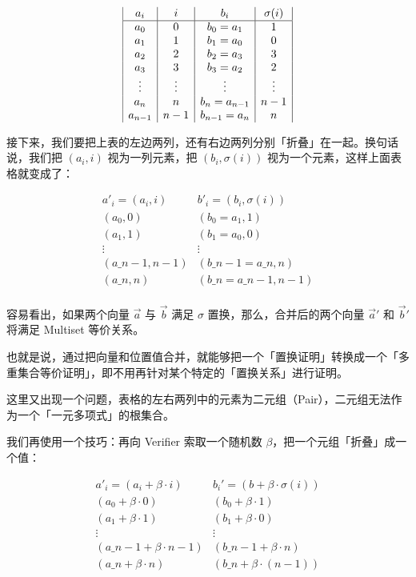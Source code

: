 \[
\begin{array}{|c|c | c|c|}
a_i & {i} & b_i & \sigma({i}) \\
\hline
a_0 & 0 & b_0=a_1 & 1 \\
a_1 & 1 & b_1=a_0 & 0 \\
a_2 & 2 & b_2=a_3 & 3 \\
a_3 & 3 & b_3=a_2 & 2 \\
\vdots & \vdots & \vdots & \vdots \\
a_n & n & b_n=a_{n-1} & n-1 \\
a_{n-1} & n-1 & b_{n-1}=a_{n} & n \\
\end{array}
\]

接下来，我们要把上表的左边两列，还有右边两列分别「折叠」在一起。换句话说，我们把
\((a_i, i)\) 视为一列元素，把 \((b_i, \sigma(i))\)
视为一个元素，这样上面表格就变成了：

\[
\begin{array}{|c|c|}
a'_i=(a_i, i) & b'_i=({b}_i, \sigma(i)) \\
\hline
(a_0, 0) & (b_0=a_1, 1) \\
(a_1, 1) & (b_1=a_0, 0) \\
\vdots & \vdots \\
(a\_{n-1}, n-1) & (b\_{n-1}=a\_{n}, n) \\
(a\_n, n) & (b\_n=a\_{n-1}, n-1) \\
\end{array}
\]

容易看出，如果两个向量 \(\vec{a}\) 与 \(\vec{b}\) 满足 \(\sigma\)
置换，那么，合并后的两个向量 \(\vec{a}'\) 和 \(\vec{b}'\) 将满足
Multiset 等价关系。

也就是说，通过把向量和位置值合并，就能够把一个「置换证明」转换成一个「多重集合等价证明」，即不用再针对某个特定的「置换关系」进行证明。

这里又出现一个问题，表格的左右两列中的元素为二元组（Pair），二元组无法作为一个「一元多项式」的根集合。

我们再使用一个技巧：再向 Verifier 索取一个随机数
\(\beta\)，把一个元组「折叠」成一个值：

\[
\begin{array}{|c|c|}
a'_i=(a_i+\beta\cdot i) & b_i'=(b + \beta\cdot \sigma(i)) \\
\hline
(a_0 + \beta\cdot 0) & (b_0 + \beta\cdot 1) \\
(a_1 + \beta\cdot 1) & (b_1 + \beta\cdot 0) \\
\vdots & \vdots \\
(a\_{n-1} + \beta\cdot n-1) & (b\_{n-1} + \beta\cdot n) \\
(a\_n + \beta\cdot n) & (b\_n + \beta\cdot (n-1))\\
\end{array}
\]

